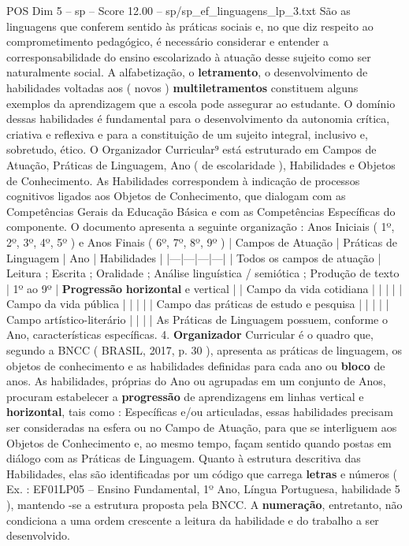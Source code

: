 \begin{textsample}{POS Dim 5 – sp – Score 12.00 – sp/sp\_ef\_linguagens\_lp\_3.txt}
São as linguagens que conferem sentido às práticas sociais e, no que diz respeito ao comprometimento pedagógico, é necessário considerar e entender a corresponsabilidade do ensino escolarizado à atuação desse sujeito como ser naturalmente social.
A alfabetização, o \textbf{letramento}, o desenvolvimento de habilidades voltadas aos ( novos ) \textbf{multiletramentos} constituem alguns exemplos da aprendizagem que a escola pode assegurar ao estudante.
O domínio dessas habilidades é fundamental para o desenvolvimento da autonomia crítica, criativa e reflexiva e para a constituição de um sujeito integral, inclusivo e, sobretudo, ético.
O Organizador Curricular⁹ está estruturado em Campos de Atuação, Práticas de Linguagem, Ano ( de escolaridade ), Habilidades e Objetos de Conhecimento.
As Habilidades correspondem à indicação de processos cognitivos ligados aos Objetos de Conhecimento, que dialogam com as Competências Gerais da Educação Básica e com as Competências Específicas do componente.
O documento apresenta a seguinte organização : Anos Iniciais ( 1º, 2º, 3º, 4º, 5º ) e Anos Finais ( 6º, 7º, 8º, 9º ) | Campos de Atuação | Práticas de Linguagem | Ano | Habilidades | |---|---|---|---| | Todos os campos de atuação | Leitura ; Escrita ; Oralidade ; Análise linguística / semiótica ; Produção de texto | 1º ao 9º | \textbf{Progressão} \textbf{horizontal} e vertical | | Campo da vida cotidiana | | | | | Campo da vida pública | | | | | Campo das práticas de estudo e pesquisa | | | | | Campo artístico-literário | | | | As Práticas de Linguagem possuem, conforme o Ano, características específicas. 4. \textbf{Organizador} Curricular é o quadro que, segundo a BNCC ( BRASIL, 2017, p. 30 ), apresenta as práticas de linguagem, os objetos de conhecimento e as habilidades definidas para cada ano ou \textbf{bloco} de anos.
As habilidades, próprias do Ano ou agrupadas em um conjunto de Anos, procuram estabelecer a \textbf{progressão} de aprendizagens em linhas vertical e \textbf{horizontal}, tais como : Específicas e/ou articuladas, essas habilidades precisam ser consideradas na esfera ou no Campo de Atuação, para que se interliguem aos Objetos de Conhecimento e, ao mesmo tempo, façam sentido quando postas em diálogo com as Práticas de Linguagem.
Quanto à estrutura descritiva das Habilidades, elas são identificadas por um código que carrega \textbf{letras} e números ( Ex. : EF01LP05 – Ensino Fundamental, 1º Ano, Língua Portuguesa, habilidade 5 ), mantendo -se a estrutura proposta pela BNCC.
A \textbf{numeração}, entretanto, não condiciona a uma ordem crescente a leitura da habilidade e do trabalho a ser desenvolvido.

\end{textsample}
